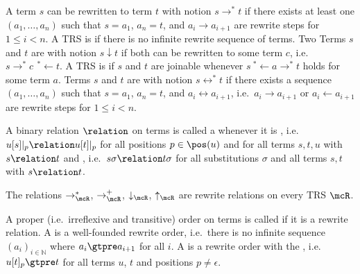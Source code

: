 \begin{definition}
A term \( s \) can be rewritten to term \( t \) with notion \( s\rightarrow^* t \)
if there exists at least one  \( (a_1,\ldots ,a_n) \) such that
\( s=a_1 \), \( a_n=t \), and \( a_i\rightarrow a_{i+1} \) are rewrite steps for \( 1\leq i<n \).
A TRS is  if there is no infinite rewrite sequence of terms.
%
Two Terms \( s \) and \( t \) are  with notion \( s\downarrow t \)
if both can be rewritten to some term \( c \), i.e.~\( s \rightarrow^*c\ \, ^*\!\!\leftarrow t \).
A TRS is  if \( s \) and \( t \) are joinable whenever \( s\ ^*\!\!\leftarrow a \rightarrow^* t \) holds for some term \( a \).
%
Terms \( s \) and \( t \) are  with notion \( s\leftrightarrow^* t \)
if there exists a sequence \( (a_1,\ldots ,a_n) \) such that
\( s=a_1 \), \( a_n=t \), and \( a_i\leftrightarrow a_{i+1} \), i.e.~\( a_i\rightarrow a_{i+1} \) or \( a_i\leftarrow a_{i+1} \) are rewrite steps for \( 1\leq i<n \).
\end{definition}
%
\begin{definition}\label{def:closed-under}
A binary relation \( \relation \) on terms is called a  whenever it is ,
i.e.~\( u[s]|_p\relation u[t]|_p \) %
for all positions \( p\in\pos(u) \) and
for all terms \( s,t,u \) with \( s\relation t \)
and ,
i.e.~\( s\sigma\relation t\sigma \) %
for all substitutions \( \sigma \)
and all terms \( s,t \) with \( s\relation t \).
\end{definition}
\begin{lemma}
The relations \( \rightarrow^*_\mcR \),
\( \rightarrow^+_\mcR \),
\( \downarrow_\mcR \), \( \uparrow_\mcR \) are rewrite relations on every TRS \( \mcR \).
\end{lemma}
%
\begin{definition}
A proper (i.e.~irreflexive and transitive) order on terms is called  if it is a rewrite relation.
A  is a well-founded rewrite order,
i.e.~there is no infinite sequence
\( (a_i)_{i\in\mathbb{N}} \)
where \( a_i\gtpre a_{i+1} \) for all \( i \).
A  is a rewrite order with the ,
i.e.~\( u[t]_p \gtpre t \) for all terms \( u \), \( t \) and positions \( p\neq\epsilon \).
\end{definition}
